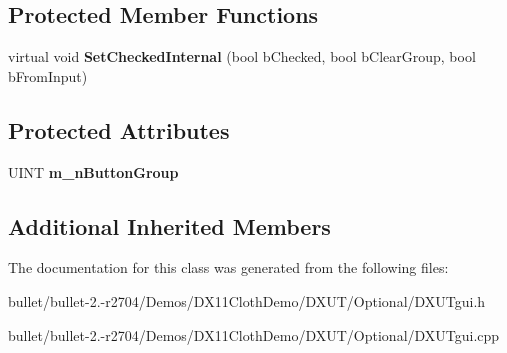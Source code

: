 \subsection*{Protected Member Functions}
\begin{DoxyCompactItemize}
\item 
\hypertarget{class_c_d_x_u_t_radio_button_acf255e4bd5ace345d6cacd01621a7000}{virtual void {\bfseries Set\+Checked\+Internal} (bool b\+Checked, bool b\+Clear\+Group, bool b\+From\+Input)}\label{class_c_d_x_u_t_radio_button_acf255e4bd5ace345d6cacd01621a7000}

\end{DoxyCompactItemize}
\subsection*{Protected Attributes}
\begin{DoxyCompactItemize}
\item 
\hypertarget{class_c_d_x_u_t_radio_button_a7d7389318e71e397b93666e7f0ca8664}{U\+I\+N\+T {\bfseries m\+\_\+n\+Button\+Group}}\label{class_c_d_x_u_t_radio_button_a7d7389318e71e397b93666e7f0ca8664}

\end{DoxyCompactItemize}
\subsection*{Additional Inherited Members}


The documentation for this class was generated from the following files\+:\begin{DoxyCompactItemize}
\item 
bullet/bullet-\/2.-\/r2704/\+Demos/\+D\+X11\+Cloth\+Demo/\+D\+X\+U\+T/\+Optional/D\+X\+U\+Tgui.\+h\item 
bullet/bullet-\/2.-\/r2704/\+Demos/\+D\+X11\+Cloth\+Demo/\+D\+X\+U\+T/\+Optional/D\+X\+U\+Tgui.\+cpp\end{DoxyCompactItemize}
